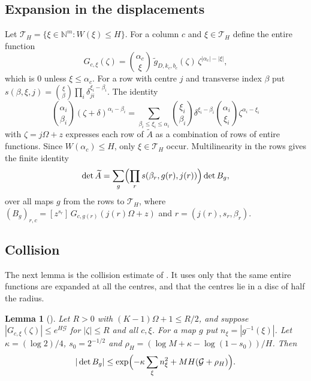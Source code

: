 \documentclass[11pt]{amsart}
\newtheorem{lemma}[theorem]{Lemma}
\theoremstyle{definition}
\theoremstyle{remark}
\numberwithin{equation}{section}
\newcommand{\N}{\mathbb N}
\newcommand{\cT}{\mathcal T}
\newcommand{\cG}{\mathcal G}
\newcommand{\tg}{\widetilde g}
\newcommand{\tA}{\widetilde A}
\newcommand{\CM}{\cite{ChudnovskyChudnovsky26}}
\begin{document}
\subsection{Expansion in the displacements}
Let $\cT_H=\{\xi\in\N^m:W(\xi)\le H\}$. For a column $c$ and $\xi\in\cT_H$ define the entire function
\[
 G_{c,\xi}(\zeta)=\binom{\alpha_c}\xi\,\tg_{D,k_c,b_c}(\zeta)\,\zeta^{|\alpha_c|-|\xi|},
\]
which is $0$ unless $\xi\le\alpha_c$. For a row with centre $j$ and transverse index $\beta$ put
$s(\beta,\xi,j)=\binom\xi\beta\prod_i\delta_{ji}^{\xi_i-\beta_i}$. The identity
\[
 \binom{\alpha_i}{\beta_i}(\zeta+\delta)^{\alpha_i-\beta_i}
 =\sum_{\beta_i\le\xi_i\le\alpha_i}\binom{\xi_i}{\beta_i}\delta^{\xi_i-\beta_i}\binom{\alpha_i}{\xi_i}
 \zeta^{\alpha_i-\xi_i}
\]
with $\zeta=j\Omega+z$ expresses each row of $\tA$ as a combination of rows of entire functions. Since
$W(\alpha_c)\le H$, only $\xi\in\cT_H$ occur. Multilinearity in the rows gives the finite identity
\begin{equation}\label{eq:tags}
 \det\tA=\sum_{g}\Bigl(\prod_rs(\beta_r,g(r),j(r))\Bigr)\det B_g,
\end{equation}
over all maps $g$ from the rows to $\cT_H$, where $(B_g)_{r,c}=[z^{s_r}]\,G_{c,g(r)}(j(r)\Omega+z)$ and
$r=(j(r),s_r,\beta_r)$.

\subsection{Collision}
The next lemma is the collision estimate of \CM. It uses only that the same entire functions are expanded at all
the centres, and that the centres lie in a disc of half the radius.

\begin{lemma}[{\cite[Lemma~16.2]{ChudnovskyChudnovsky26}}]\label{lem:collision}
Let $R>0$ with $(K-1)\Omega+1\le R/2$, and suppose $|G_{c,\xi}(\zeta)|\le e^{H\cG}$ for $|\zeta|\le R$ and all
$c,\xi$. For a map $g$ put $n_\xi=|g^{-1}(\xi)|$. Let $\kappa=(\log2)/4$, $s_0=2^{-1/2}$ and
$\rho_H=(\log M+\kappa-\log(1-s_0))/H$. Then
\[
 |\det B_g|\le\exp\Bigl(-\kappa\sum_\xi n_\xi^2+MH(\cG+\rho_H)\Bigr).
\]
\end{lemma}
\end{document}
